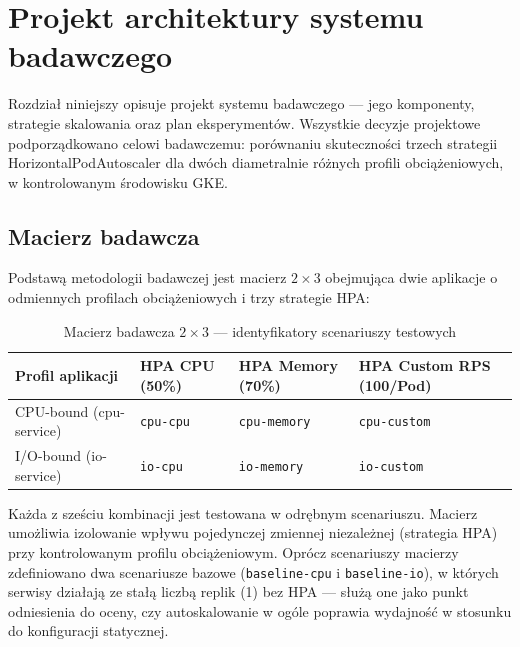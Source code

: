 \chapter{Projekt architektury systemu badawczego}

Rozdział niniejszy opisuje projekt systemu badawczego --- jego komponenty, strategie skalowania oraz plan eksperymentów. Wszystkie decyzje projektowe podporządkowano celowi badawczemu: porównaniu skuteczności trzech strategii HorizontalPodAutoscaler dla dwóch diametralnie różnych profili obciążeniowych, w kontrolowanym środowisku GKE.

\section{Macierz badawcza}

Podstawą metodologii badawczej jest macierz $2 \times 3$ obejmująca dwie aplikacje o odmiennych profilach obciążeniowych i trzy strategie HPA:

\begin{table}[H]
  \centering
  \begin{tabularx}{\textwidth}{|l|X|X|X|}
    \hline
    \textbf{Profil aplikacji} & \textbf{HPA CPU (50\%)} & \textbf{HPA Memory (70\%)} & \textbf{HPA Custom RPS (100/Pod)} \\
    \hline
    CPU-bound (cpu-service) & \texttt{cpu-cpu} & \texttt{cpu-memory} & \texttt{cpu-custom} \\
    \hline
    I/O-bound (io-service) & \texttt{io-cpu} & \texttt{io-memory} & \texttt{io-custom} \\
    \hline
  \end{tabularx}
  \caption{Macierz badawcza $2 \times 3$ --- identyfikatory scenariuszy testowych}
  \label{tab:research-matrix}
\end{table}

Każda z sześciu kombinacji jest testowana w odrębnym scenariuszu. Macierz umożliwia izolowanie wpływu pojedynczej zmiennej niezależnej (strategia HPA) przy kontrolowanym profilu obciążeniowym. Oprócz scenariuszy macierzy zdefiniowano dwa scenariusze bazowe (\texttt{baseline-cpu} i \texttt{baseline-io}), w których serwisy działają ze stałą liczbą replik (1) bez HPA --- służą one jako punkt odniesienia do oceny, czy autoskalowanie w ogóle poprawia wydajność w stosunku do konfiguracji statycznej.

